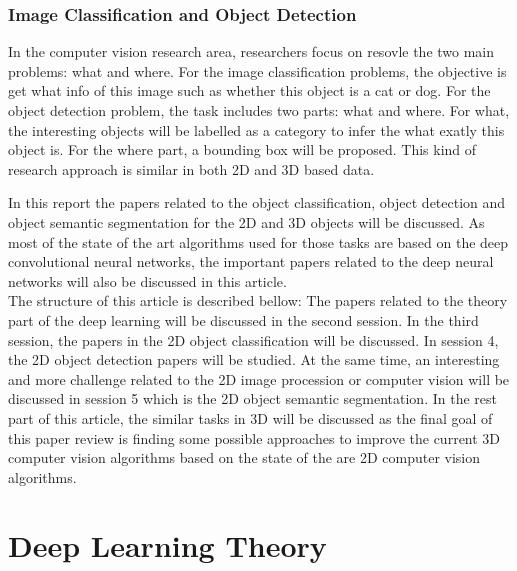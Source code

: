 \documentclass[a4paper,12pt]{article}
\begin{document}
 

\section{Image Classification and Object Detection}
In the computer vision research area, researchers focus on resovle the two main problems: what and where. For the image classification problems, the objective is get what info of this image such as whether this object is a cat or dog. For the object detection problem, the task includes two parts: what and where. For what, the interesting objects will be labelled as a category to infer the what exatly this object is. For the where part, a bounding box will be proposed. This kind of research approach is similar in both 2D and 3D based data.

In this report the papers related to the object classification, object detection and object semantic segmentation for the 2D and 3D objects will be discussed. As most of the state of the art algorithms used for those tasks are based on the deep convolutional neural networks, the important papers related to the deep neural networks will also be discussed in this article.\\
The structure of this article is described bellow: The papers related to the theory part of the deep learning will be discussed in the second session. In the third session, the papers in the 2D object classification will be discussed. In session 4, the 2D object detection papers will be studied. At the same time, an interesting and more challenge related to the 2D image procession or computer vision will be discussed in session 5 which is the 2D object semantic segmentation. In the rest part of this article, the similar tasks in 3D will be discussed as the final goal of this paper review is finding some possible approaches to improve the current 3D computer vision algorithms based on the state of the are 2D computer vision algorithms.\\

\part{Deep Learning Theory}
\end{document}
